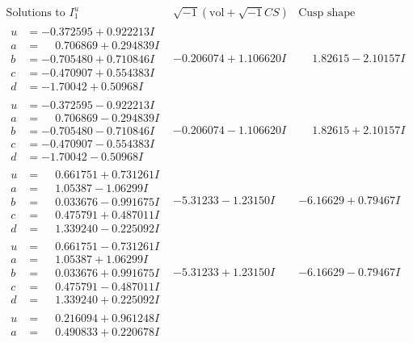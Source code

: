 \documentclass[1p]{elsarticle_modified}
\theoremstyle{definition}
\newcommand{\I}{\sqrt{-1}}
\begin{document}
$$\begin{array}{c|c|c}  
\text{Solutions to }I^u_{1}& \I (\text{vol} + \sqrt{-1}CS) & \text{Cusp shape}\\
 \hline 
\begin{aligned}
u &= -0.372595 + 0.922213 I \\
a &= \phantom{-}0.706869 + 0.294839 I \\
b &= -0.705480 + 0.710846 I \\
c &= -0.470907 + 0.554383 I \\
d &= -1.70042 + 0.50968 I\end{aligned}
 & -0.206074 + 1.106620 I & \phantom{-}1.82615 - 2.10157 I \\ \hline\begin{aligned}
u &= -0.372595 - 0.922213 I \\
a &= \phantom{-}0.706869 - 0.294839 I \\
b &= -0.705480 - 0.710846 I \\
c &= -0.470907 - 0.554383 I \\
d &= -1.70042 - 0.50968 I\end{aligned}
 & -0.206074 - 1.106620 I & \phantom{-}1.82615 + 2.10157 I \\ \hline\begin{aligned}
u &= \phantom{-}0.661751 + 0.731261 I \\
a &= \phantom{-}1.05387 - 1.06299 I \\
b &= \phantom{-}0.033676 - 0.991675 I \\
c &= \phantom{-}0.475791 + 0.487011 I \\
d &= \phantom{-}1.339240 - 0.225092 I\end{aligned}
 & -5.31233 - 1.23150 I & -6.16629 + 0.79467 I \\ \hline\begin{aligned}
u &= \phantom{-}0.661751 - 0.731261 I \\
a &= \phantom{-}1.05387 + 1.06299 I \\
b &= \phantom{-}0.033676 + 0.991675 I \\
c &= \phantom{-}0.475791 - 0.487011 I \\
d &= \phantom{-}1.339240 + 0.225092 I\end{aligned}
 & -5.31233 + 1.23150 I & -6.16629 - 0.79467 I \\ \hline\begin{aligned}
u &= \phantom{-}0.216094 + 0.961248 I \\
a &= \phantom{-}0.490833 + 0.220678 I \\

\end{aligned}
\end{array}$$
\end{document}
